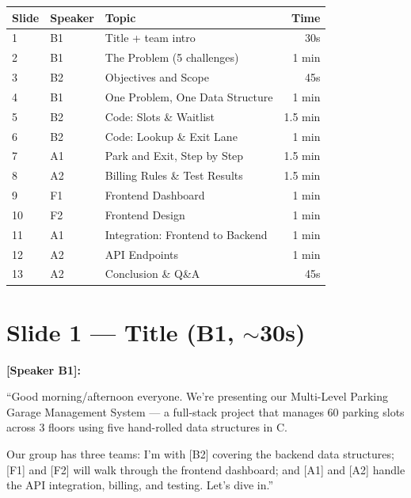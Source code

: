 \documentclass[12pt, a4paper]{article}
\begin{document}
\vspace{0.5em}
\begin{table}[h]
\centering
\small
\begin{tabularx}{\textwidth}{@{}llXr@{}}
\toprule
\textbf{Slide} & \textbf{Speaker} & \textbf{Topic} & \textbf{Time} \\
\midrule
1  & B1 & Title + team intro                    & 30s \\
2  & B1 & The Problem (5 challenges)            & 1 min \\
3  & B2 & Objectives and Scope                  & 45s \\
4  & B1 & One Problem, One Data Structure        & 1 min \\
5  & B2 & Code: Slots \& Waitlist               & 1.5 min \\
6  & B2 & Code: Lookup \& Exit Lane             & 1 min \\
7  & A1 & Park and Exit, Step by Step           & 1.5 min \\
8  & A2 & Billing Rules \& Test Results          & 1.5 min \\
9  & F1 & Frontend Dashboard                    & 1 min \\
10 & F2 & Frontend Design                       & 1 min \\
11 & A1 & Integration: Frontend to Backend      & 1 min \\
12 & A2 & API Endpoints                         & 1 min \\
13 & A2 & Conclusion \& Q\&A                    & 45s \\
\bottomrule
\end{tabularx}
\end{table}

\section{Slide 1 --- Title (B1, $\sim$30s)}

\textbf{[Speaker B1]:}

``Good morning/afternoon everyone. We're presenting our Multi-Level Parking Garage Management System --- a full-stack project that manages 60 parking slots across 3 floors using five hand-rolled data structures in C.

Our group has three teams: I'm with [B2] covering the backend data structures; [F1] and [F2] will walk through the frontend dashboard; and [A1] and [A2] handle the API integration, billing, and testing. Let's dive in.''
\end{document}
